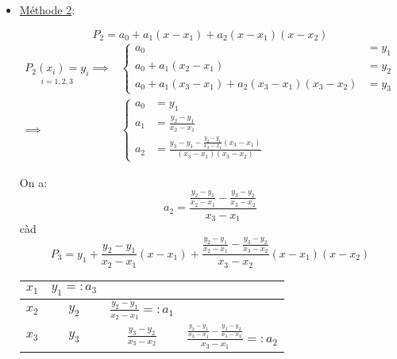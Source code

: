 \begin{eg}
\begin{itemize}
\begin{remark}
\[              \] 
           \end{remark}
        \item \underline{Méthode 2}:\par
            \[
            P_2 = a_0 + a_1(x - x_1) + a_2(x - x_1)(x - x_2)
            \] 
            \begin{align*}
                \underset{i = 1,2,3}{P_2(x_i) = y_i} \implies &\begin{cases}
                    a_0 &=y_1\\
                    a_0 + a_1(x_2 - x_1) &= y_2\\
                    a_0 + a_1(x_3 - x_1) + a_2(x_3 - x_1)(x_3 - x_2) &= y_3
                \end{cases}\\
                                                        \implies &\begin{cases}
                                                                  a_0 &= y_1\\
                                                                  a_1 &= \frac{y_2 - y_1}{x_2 - x_1}\\
                                                                  a_2 &= \frac{y_3 - y_1 - \frac{y_2 - y_1}{x_2 - x_1}(x_3 - x_1)}{(x_3 - x_1)(x_3 - x_2)}
                                                              \end{cases}
            \end{align*}
            \begin{remark}
               On a:
               \[
               a_2 = \frac{\frac{y_2 - y_1}{x_2 - x_1} - \frac{y_3 - y_2}{x_3 - x_2}}{x_3 - x_1}
               \] 
               càd 
               \[
               P_3 = y_1 + \frac{y_2 - y_1}{x_2 - x_1}(x - x_1) + \frac{\frac{y_2 - y_1}{x_2 - x_1} - \frac{y_3 - y_2}{x_3 - x_2}}{x_3 - x_2}(x-x_1)(x-x_2)
               \] 
               \begin{center}
                   \begin{tabular}{| c | c | c | c |}
                       \hline
                   $x_1$ & $y_1 =: a_3$ &  &  \\
                       \hline
                   $x_2$ & $y_2$ & $\frac{y_2 - y_1}{x_2 - x_1} =: a_1$ & \\
                   \hline
                   $x_3$ & $y_3$ & $\frac{y_3 - y_2}{x_3 - x_2}$ & $\frac{\frac{y_2 - y_1}{x_2 - x_1} - \frac{y_3 - y_2}{x_3 - x_2}}{x_3 - x_1} =: a_2$\\

\end{tabular}
\end{center}
\end{remark}
\end{itemize}
\end{eg}
